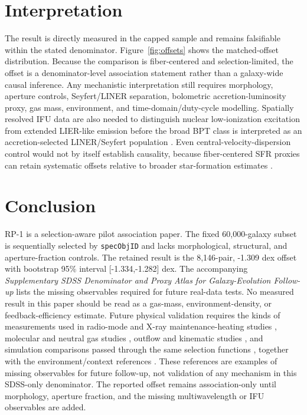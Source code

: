 \documentclass[twocolumn]{aastex631}
\begin{document}
\section{Interpretation}
The result is directly measured in the capped sample and remains falsifiable within the stated denominator. Figure~\ref{fig:offsets} shows the matched-offset distribution. Because the comparison is fiber-centered and selection-limited, the offset is a denominator-level association statement rather than a galaxy-wide causal inference. Any mechanistic interpretation still requires morphology, aperture controls, Seyfert/LINER separation, bolometric accretion-luminosity proxy, gas mass, environment, and time-domain/duty-cycle modelling. Spatially resolved IFU data are also needed to distinguish nuclear low-ionization excitation from extended LIER-like emission before the broad BPT class is interpreted as an accretion-selected LINER/Seyfert population \citep{belfiore2016}. Even central-velocity-dispersion control would not by itself establish causality, because fiber-centered SFR proxies can retain systematic offsets relative to broader star-formation estimates \citep{salim2012}.

\section{Conclusion}
RP-1 is a selection-aware pilot association paper. The fixed 60,000-galaxy subset is sequentially selected by \texttt{specObjID} and lacks morphological, structural, and aperture-fraction controls. The retained result is the 8,146-pair, -1.309 dex offset with bootstrap 95\% interval [-1.334,-1.282] dex. The accompanying \emph{Supplementary SDSS Denominator and Proxy Atlas for Galaxy-Evolution Follow-up} lists the missing observables required for future real-data tests. No measured result in this paper should be read as a gas-mass, environment-density, or feedback-efficiency estimate.
Future physical validation requires the kinds of measurements used in radio-mode and X-ray maintenance-heating studies \citep{best2005,fabian2012,mcnamara2007,heckmanbest2014,lamassa2013}, molecular and neutral gas studies \citep{xcoldgass2017,xgass2018}, outflow and kinematic studies \citep{veilleux2005,cicone2014,carniani2017,fiore2017}, and simulation comparisons passed through the same selection functions \citep{simba2019,tng2019,eagle2015}, together with the environment/context references \citep{peng2010,ellison2011,piotrowska2022,wetzel2013,dekel2006}. These references are examples of missing observables for future follow-up, not validation of any mechanism in this SDSS-only denominator. The reported offset remains association-only until morphology, aperture fraction, and the missing multiwavelength or IFU observables are added.
\end{document}
